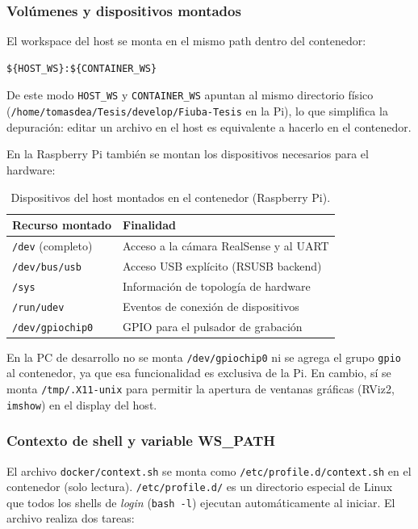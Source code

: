 \subsubsection{Volúmenes y dispositivos montados}

El workspace del host se monta en el mismo path dentro del contenedor:

\begin{verbatim}
${HOST_WS}:${CONTAINER_WS}
\end{verbatim}

De este modo \texttt{HOST\_WS} y \texttt{CONTAINER\_WS} apuntan al mismo
directorio físico (\texttt{/home/tomasdea/Tesis/develop/Fiuba-Tesis} en la
Pi), lo que simplifica la depuración: editar un archivo en el host es
equivalente a hacerlo en el contenedor.

En la Raspberry Pi también se montan los dispositivos necesarios para el
hardware:

\begin{table}[H]
\centering
\begin{tabular}{ll}
\toprule
\textbf{Recurso montado} & \textbf{Finalidad} \\
\midrule
\texttt{/dev} (completo) & Acceso a la cámara RealSense y al UART \\
\texttt{/dev/bus/usb}    & Acceso USB explícito (RSUSB backend) \\
\texttt{/sys}            & Información de topología de hardware \\
\texttt{/run/udev}       & Eventos de conexión de dispositivos \\
\texttt{/dev/gpiochip0}  & GPIO para el pulsador de grabación \\
\bottomrule
\end{tabular}
\caption{Dispositivos del host montados en el contenedor (Raspberry Pi).}
\label{tab:raspi-mounts}
\end{table}

En la PC de desarrollo no se monta \texttt{/dev/gpiochip0} ni se agrega el
grupo \texttt{gpio} al contenedor, ya que esa funcionalidad es exclusiva de
la Pi. En cambio, sí se monta \texttt{/tmp/.X11-unix} para permitir la
apertura de ventanas gráficas (RViz2, \texttt{imshow}) en el display del
host.

\subsubsection{Contexto de shell y variable WS\_PATH}

El archivo \texttt{docker/context.sh} se monta como
\texttt{/etc/profile.d/context.sh} en el contenedor (solo lectura).
\texttt{/etc/profile.d/} es un directorio especial de Linux que todos los
shells de \emph{login} (\texttt{bash -l}) ejecutan automáticamente al
iniciar. El archivo realiza dos tareas:

